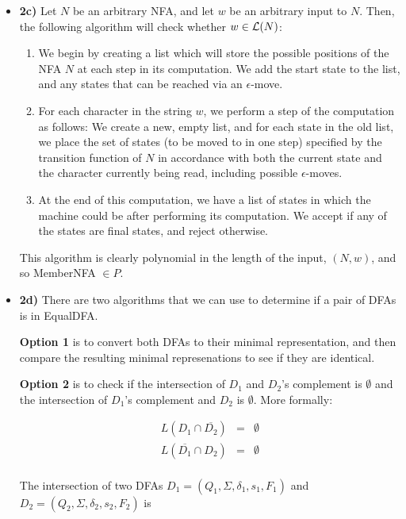 \documentclass[12pt]{article}
\begin{document}
\begin{enumerate}
\begin{itemize}
\item \textbf{2c)} Let $N$ be an arbitrary NFA, and let $w$ be an arbitrary input to $N$. Then, the following algorithm will check whether $w \in {\cal L}(N)$:

\begin{enumerate}

\item We begin by creating a list which will store the possible positions of the NFA $N$ at each step in its computation. We add the start state to the list, and any states that can be reached via an $\epsilon$-move.

\item For each character in the string $w$, we perform a step of the computation as follows: We create a new, empty list, and for each state in the old list, we place the set of states (to be moved to in one step) specified by the transition function of $N$ in accordance with both the current state and the character currently being read, including possible $\epsilon$-moves. 

\item At the end of this computation, we have a list of states in which the machine could be after performing its computation. We accept if any of the states are final states, and reject otherwise.

\end{enumerate}

This algorithm is clearly polynomial in the length of the input, $(N,w)$, and so MemberNFA $\in P$.

\item \textbf{2d)} There are two algorithms that we can use to determine if a pair of DFAs is in EqualDFA. 

\textbf{Option 1} is to convert both DFAs to their minimal representation, and then compare the
resulting minimal represenations to see if they are identical.  


\textbf{Option 2} is to check if the intersection of $D_1$ and $D_2$'s complement is $\emptyset$ and the intersection of $D_1$'s complement and $D_2$ is $\emptyset$. More formally:

\[
\begin{array}{lcr}
L(D_1 \cap \overline{D_2}) & = & \emptyset \\
L(\overline{D_1} \cap D_2) & = & \emptyset \\
\end{array} 
\]

The intersection of two DFAs $D_1 = (Q_1, \Sigma, \delta_1, s_1, F_1)$ and $D_2 = (Q_2, \Sigma,
\delta_2, s_2, F_2)$  is


\end{itemize}
\end{enumerate}
\end{document}
